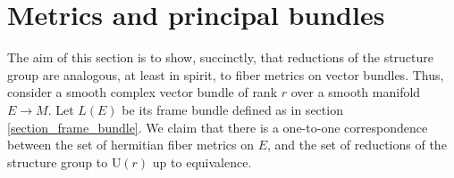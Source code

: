 
\section{Metrics and principal bundles}
The aim of this section is to show, succinctly, that reductions of the structure group are analogous, at least in spirit, to fiber metrics on vector bundles. Thus, consider a smooth complex vector bundle of rank \(r\) over a smooth manifold \(E \to M\). Let \(L(E)\) be its frame bundle defined as in section \ref{section_frame_bundle}. We claim that there is a one-to-one correspondence between the set of hermitian fiber metrics on \(E\), and the set of reductions of the structure group to \(\mathrm{U}(r)\) up to equivalence. \\

